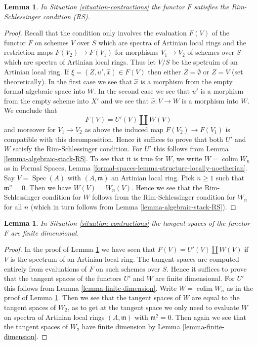 \documentclass{stacks-project}
\theoremstyle{plain}
\newtheorem{lemma}[subsection]{Lemma}
\theoremstyle{definition}
\theoremstyle{remark}
\numberwithin{equation}{subsection}
\def\colim{\mathop{\mathrm{colim}}\nolimits}
\def\Spec{\mathop{\mathrm{Spec}}}
\begin{document}
\begin{lemma}
\label{lemma-rs}
In Situation \ref{situation-contractions} the functor $F$ satisfies
the Rim-Schlessinger condition (RS).
\end{lemma}

\begin{proof}
Recall that the condition only involves the evaluation $F(V)$ of the functor
$F$ on schemes $V$ over $S$ which are spectra of Artinian local rings
and the restriction maps $F(V_2) \to F(V_1)$ for morphisms $V_1 \to V_2$
of schemes over $S$ which are spectra of Artinian local rings.
Thus let $V/S$ be the spetruim of an Artinian local ring.
If $\xi = (Z, u', \hat x) \in F(V)$ then either $Z = \emptyset$
or $Z = V$ (set theoretically). In the first case we see that
$\hat x$ is a morphism from the empty formal algebraic space
into $W$. In the second case we see that $u'$ is a morphism from
the empty scheme into $X'$ and we see that $\hat x : V \to W$
is a morphism into $W$. We conclude that
$$
F(V) = U'(V) \amalg W(V)
$$
and moreover for $V_1 \to V_2$ as above the induced map
$F(V_2) \to F(V_1)$ is compatible with this decomposition.
Hence it suffices to prove that both $U'$ and $W$ satisfy the
Rim-Schlessinger condition. For $U'$ this follows from
Lemma \ref{lemma-algebraic-stack-RS}.
To see that it is true for $W$, we write $W = \colim W_n$ as in
Formal Spaces, Lemma
\ref{formal-spaces-lemma-structure-locally-noetherian}.
Say $V = \Spec(A)$ with $(A, \mathfrak m)$ an Artinian local ring.
Pick $n \geq 1$ such that $\mathfrak m^n = 0$. Then we have
$W(V) = W_n(V)$. Hence we see that the Rim-Schlessinger condition
for $W$ follows from the Rim-Schlessinger condition for $W_n$ for
all $n$ (which in turn follows from
Lemma \ref{lemma-algebraic-stack-RS}).
\end{proof}

\begin{lemma}
\label{lemma-finite-dim}
In Situation \ref{situation-contractions} the tangent spaces of
the functor $F$ are finite dimensional.
\end{lemma}

\begin{proof}
In the proof of Lemma \ref{lemma-rs} we have seen that
$F(V) = U'(V) \amalg W(V)$ if $V$ is the spectrum of an Artinian
local ring. The tangent spaces are computed entirely from evaluations
of $F$ on such schemes over $S$.
Hence it suffices to prove that the tangent spaces
of the functors $U'$ and $W$ are finite dimensional.
For $U'$ this follows from
Lemma \ref{lemma-finite-dimension}.
Write $W = \colim W_n$ as in the proof of Lemma \ref{lemma-rs}.
Then we see that the tangent spaces of $W$ are equal to the
tangent spaces of $W_2$, as to get at the tangent space
we only need to evaluate $W$ on spectra of Artinian local
rings $(A, \mathfrak m)$ with $\mathfrak m^2 = 0$.
Then again we see that the tangent spaces of $W_2$ have
finite dimension by
Lemma \ref{lemma-finite-dimension}.
\end{proof}
\end{document}
